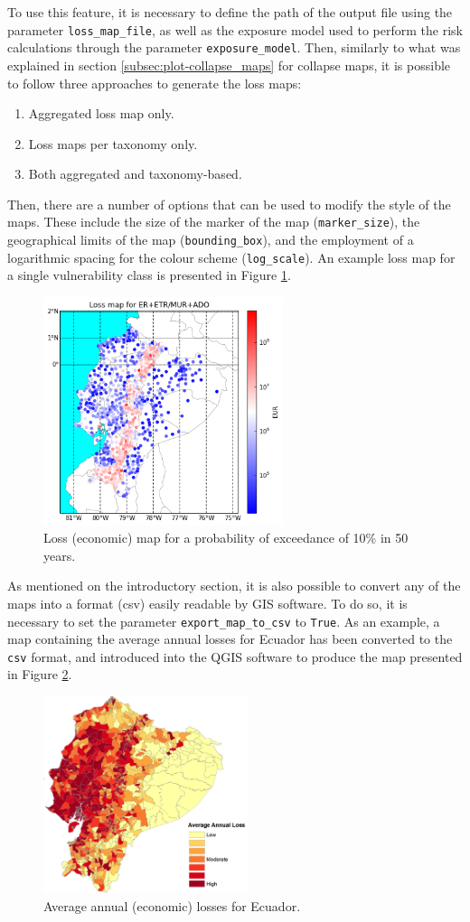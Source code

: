 To use this feature, it is necessary to define the path of the output file using the parameter \verb=loss_map_file=, as well as the exposure model used to perform the risk calculations through the parameter \verb=exposure_model=. Then, similarly to what was explained in section \ref{subsec:plot-collapse_maps} for collapse maps, it is possible to follow three approaches to generate the loss maps:\\

\begin{enumerate}
\item Aggregated loss map only.
\item Loss maps per taxonomy only.
\item Both aggregated and taxonomy-based.\\
\end{enumerate}

Then, there are a number of options that can be used to modify the style of the maps. These include the size of the marker of the map (\verb=marker_size=), the geographical limits of the map (\verb=bounding_box=), and the employment of a logarithmic spacing for the colour scheme (\verb=log_scale=). An example loss map for a single vulnerability class is presented in Figure \ref{fig:loss_map}.

\begin{figure}[htb]
  \centering
      \includegraphics[width=7cm]{figures/loss_map.png}
  \caption{Loss (economic) map for a probability of exceedance of 10\% in 50 years.}
  \label{fig:loss_map}
\end{figure}

As mentioned on the introductory section, it is also possible to convert any of the maps into a format (csv) easily readable by GIS software. To do so, it is necessary to set the parameter \verb=export_map_to_csv= to \verb=True=. As an example, a map containing the average annual losses for Ecuador has been converted to the \verb=csv= format, and introduced into the QGIS software to produce the map presented in Figure \ref{fig:all_loss_map}.

\begin{figure}[htb]
  \centering
      \includegraphics[width=6cm]{figures/loss_map_AAL.png}
  \caption{Average annual (economic) losses for Ecuador.}
  \label{fig:all_loss_map}
\end{figure}
